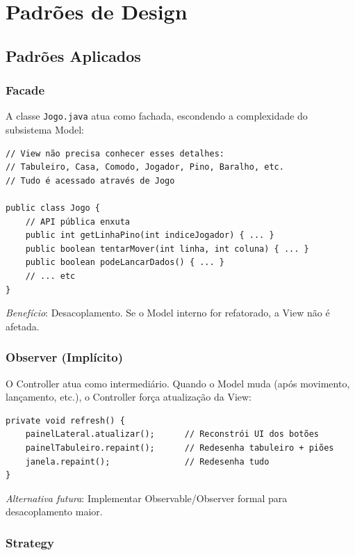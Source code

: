 \documentclass[12pt,a4paper]{report}
\begin{document}
\chapter{Padrões de Design}

\section{Padrões Aplicados}

\subsection{Facade}

A classe \texttt{Jogo.java} atua como fachada, escondendo a complexidade do subsistema Model:

\begin{lstlisting}
// View não precisa conhecer esses detalhes:
// Tabuleiro, Casa, Comodo, Jogador, Pino, Baralho, etc.
// Tudo é acessado através de Jogo

public class Jogo {
    // API pública enxuta
    public int getLinhaPino(int indiceJogador) { ... }
    public boolean tentarMover(int linha, int coluna) { ... }
    public boolean podeLancarDados() { ... }
    // ... etc
}
\end{lstlisting}

\textit{Benefício}: Desacoplamento. Se o Model interno for refatorado, a View não é afetada.

\subsection{Observer (Implícito)}

O Controller atua como intermediário. Quando o Model muda (após movimento, lançamento, etc.), o Controller força atualização da View:

\begin{lstlisting}
private void refresh() {
    painelLateral.atualizar();      // Reconstrói UI dos botões
    painelTabuleiro.repaint();      // Redesenha tabuleiro + piões
    janela.repaint();               // Redesenha tudo
}
\end{lstlisting}

\textit{Alternativa futura}: Implementar Observable/Observer formal para desacoplamento maior.

\subsection{Strategy}
\end{document}
